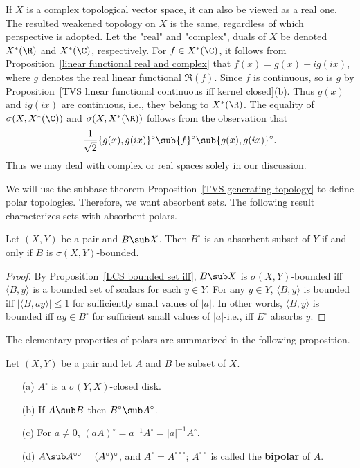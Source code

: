 \begin{example}
If $X$ is a complex topological vector space, it can also be viewed as a real one. The resulted weakened topology on $X$ is the same, regardless of which perspective is adopted. Let the "real" and "complex", duals of $X$ be denoted $X^*(\R)$ and $X^*(\C)$, respectively. For $f\in X^*(\C)$, it follows from Proposition~\ref{linear functional real and complex} that $f(x)=g(x)-ig(ix)$, where $g$ denotes the real linear functional $\Re(f)$. Since $f$ is continuous, so is $g$ by Proposition~\ref{TVS linear functional continuous iff kernel closed}(b). Thus $g(x)$ and $ig(ix)$ are continuous, i.e., they belong to $X^*(\R)$. The equality of $\sigma(X,X^*(\C))$ and $\sigma(X,X^*(\R))$ follows from the observation that
\[\frac{1}{\sqrt{2}}\{g(x),g(ix)\}^{\circ}\sub\{f\}^\circ\sub\{g(x),g(ix)\}^{\circ}.\]
Thus we may deal with complex or real spaces solely in our discussion.
\end{example}
We will use the subbase theorem Proposition~\ref{TVS generating topology} to define polar topologies. Therefore, we want absorbent sets. The following result characterizes sets with absorbent polars.
\begin{proposition}\label{polar absorbent iff set bounded}
Let $(X,Y)$ be a pair and $B\sub X$. Then $B^\circ$ is an absorbent subset of $Y$ if and only if $B$ is $\sigma(X,Y)$-bounded.
\end{proposition}
\begin{proof}
By Proposition~\ref{LCS bounded set iff}, $B\sub X$ is $\sigma(X,Y)$-bounded iff $\langle B,y\rangle$ is a bounded set of scalars for each $y\in Y$. For any $y\in Y$, $\langle B,y\rangle$ is bounded iff $|\langle B,ay\rangle|\leq 1$ for sufficiently small values of $|a|$. In other words, $\langle B,y\rangle$ is bounded iff $ay\in B^{\circ}$ for sufficient small values of $|a|$-i.e., iff $E^\circ$ absorbs $y$.
\end{proof}
The elementary properties of polars are summarized in the following proposition.
\begin{proposition}\label{polar prop}
Let $(X,Y)$ be a pair and let $A$ and $B$ be subset of $X$.
\begin{itemize}
\item[(a)] $A^\circ$ is a $\sigma(Y,X)$-closed disk.
\item[(b)] If $A\sub B$ then $B^\circ\sub A^\circ$.
\item[(c)] For $a\neq 0$, $(aA)^\circ=a^{-1}A^\circ=|a|^{-1}A^\circ$.
\item[(d)] $A\sub A^{\circ\circ}=(A^\circ)^\circ$, and $A^\circ=A^{\circ\circ\circ}$; $A^{\circ\circ}$ is called the \textbf{bipolar} of $A$.
\end{itemize}
\end{proposition}
